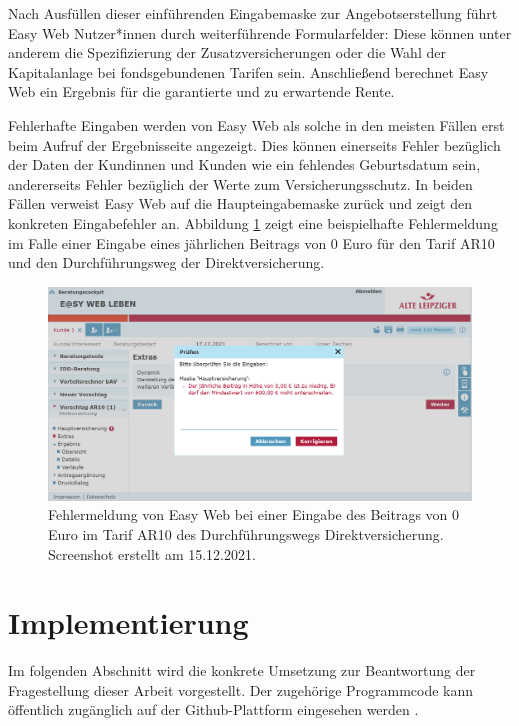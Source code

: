 Nach Ausfüllen dieser einführenden Eingabemaske zur Angebotserstellung führt Easy Web Nutzer*innen durch weiterführende Formularfelder: Diese können unter anderem die Spezifizierung der Zusatzversicherungen oder die Wahl der Kapitalanlage bei fondsgebundenen Tarifen sein. Anschließend berechnet Easy Web ein Ergebnis für die garantierte und zu erwartende Rente. 

Fehlerhafte Eingaben werden von Easy Web als solche in den meisten Fällen erst beim Aufruf der Ergebnisseite angezeigt. Dies können einerseits Fehler bezüglich der Daten der Kundinnen und Kunden wie ein fehlendes Geburtsdatum sein, andererseits Fehler bezüglich der Werte zum Versicherungsschutz. In beiden Fällen verweist Easy Web auf die Haupteingabemaske zurück und zeigt den konkreten Eingabefehler an. Abbildung \ref{fig:easyWebFehler} zeigt eine beispielhafte Fehlermeldung im Falle einer Eingabe eines jährlichen Beitrags von 0 Euro für den Tarif AR10 und den Durchführungsweg der Direktversicherung.

\begin{figure}[!htb]
\centering
\includegraphics[width=0.8\columnwidth]{images/Easy_Web_Fehler.png}
\caption{Fehlermeldung von Easy Web bei einer Eingabe des Beitrags von 0 Euro im Tarif AR10 des Durchführungswegs Direktversicherung. Screenshot erstellt am 15.12.2021.}
\label{fig:easyWebFehler}
\end{figure}

\section{Implementierung}\label{sec:implementierung}

Im folgenden Abschnitt wird die konkrete Umsetzung zur Beantwortung der Fragestellung dieser Arbeit vorgestellt. Der zugehörige Programmcode kann öffentlich zugänglich auf der Github-Plattform eingesehen werden \cite{github}.

